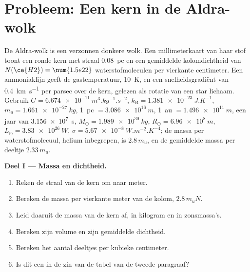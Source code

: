 \section{Probleem: Een kern in de Aldra-wolk}

\begin{problem}
\label{pb:b2:ism-star-formation:1}
De Aldra-wolk is een verzonnen donkere wolk. Een millimeterkaart van haar stof
toont een ronde kern met straal \qty{0.08}{pc} en een gemiddelde kolomdichtheid van
$N(\ce{H2}) = \num{1.5e22}$ waterstofmoleculen per vierkante centimeter. Een
ammoniaklijn geeft de gastemperatuur, \qty{10}{K}, en een snelheidsgradiënt
van \qty{0.4}{km.s^{-1}} per parsec over de kern, gelezen als rotatie van een star
lichaam. Gebruik $G = \qty{6.674e-11}{m^3.kg^{-1}.s^{-2}}$,
$k_{\mathrm B} = \qty{1.381e-23}{J.K^{-1}}$, $m_u = \qty{1.661e-27}{kg}$,
\qty{1}{pc} $= \qty{3.086e16}{m}$, \qty{1}{au} $= \qty{1.496e11}{m}$, een jaar van
\qty{3.156e7}{s}, $M_\odot = \qty{1.989e30}{kg}$, $R_\odot = \qty{6.96e8}{m}$,
$L_\odot = \qty{3.83e26}{W}$, $\sigma = \qty{5.67e-8}{W.m^{-2}.K^{-4}}$; de
massa per waterstofmolecuul, helium inbegrepen, is $2.8\,m_u$, en de gemiddelde massa
per deeltje $2.33\,m_u$.

\medskip
\noindent\textbf{Deel I --- Massa en dichtheid.}
\begin{enumerate}
  \item Reken de straal van de kern om naar meter.
  \item Bereken de massa per vierkante meter van de kolom, $2.8\,m_u N$.
  \item Leid daaruit de massa van de kern af, in kilogram en in zonsmassa's.
  \item Bereken zijn volume en zijn gemiddelde dichtheid.
  \item Bereken het aantal deeltjes per kubieke centimeter.
  \item Is dit een  in de zin van de tabel van de tweede paragraaf?
\end{enumerate}


\end{problem}
